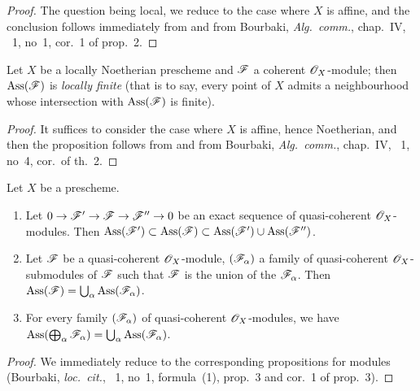 \begin{proof}
The question being local, we reduce to the case where $X$ is affine, and the conclusion follows immediately from  and from Bourbaki, \emph{Alg.\ comm.}, chap.~IV, \textsection~1, no~1, cor.~1 of prop.~2.
\end{proof}

\begin{proposition}[3.1.6]
\label{IV.3.1.6}
Let $X$ be a locally Noetherian prescheme and $\mathscr{F}$ a coherent $\mathscr{O}_X$-module; then $\operatorname{Ass}(\mathscr{F})$ is \emph{locally finite} (that is to say, every point of $X$ admits a neighbourhood whose intersection with $\operatorname{Ass}(\mathscr{F})$ is finite).
\end{proposition}

\begin{proof}
It suffices to consider the case where $X$ is affine, hence Noetherian, and then the proposition follows from  and from Bourbaki, \emph{Alg.\ comm.}, chap.~IV, \textsection~1, no~4, cor.\ of th.~2.
\end{proof}

\begin{proposition}[3.1.7]
\label{IV.3.1.7}
Let $X$ be a prescheme.
\begin{enumerate}
  \item[(i)] Let $0\to\mathscr{F}'\to\mathscr{F}\to\mathscr{F}''\to 0$ be an exact sequence of quasi-coherent $\mathscr{O}_X$-modules.
  Then $\operatorname{Ass}(\mathscr{F}')\subset\operatorname{Ass}(\mathscr{F})\subset\operatorname{Ass}(\mathscr{F}')\cup\operatorname{Ass}(\mathscr{F}'')$.
  \item[(ii)] Let $\mathscr{F}$ be a quasi-coherent $\mathscr{O}_X$-module, $(\mathscr{F}_\alpha)$ a family of quasi-coherent $\mathscr{O}_X$-submodules of $\mathscr{F}$ such that $\mathscr{F}$ is the union of the $\mathscr{F}_\alpha$.
  Then $\operatorname{Ass}(\mathscr{F})=\bigcup_\alpha\operatorname{Ass}(\mathscr{F}_\alpha)$.
  \item[(iii)] For every family $(\mathscr{F}_\alpha)$ of quasi-coherent $\mathscr{O}_X$-modules, we have $\operatorname{Ass}(\bigoplus_\alpha\mathscr{F}_\alpha)=\bigcup_\alpha\operatorname{Ass}(\mathscr{F}_\alpha)$.
\end{enumerate}
\end{proposition}

\begin{proof}
We immediately reduce to the corresponding propositions for modules (Bourbaki, \emph{loc.\ cit.}, \textsection~1, no~1, formula~(1), prop.~3 and cor.~1 of prop.~3).
\end{proof}

